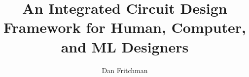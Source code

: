 \documentclass{ucbthesis}
\begin{document}
\title{An Integrated Circuit Design Framework for Human, Computer, and ML Designers}
\author{Dan Fritchman}

\maketitle
\copyrightpage

\begin{abstract}
\begin{markdown}
\end{markdown}
\end{abstract}

\begin{frontmatter}

\begin{dedication}
\null\vfil
\begin{center}
\begin{markdown}
\end{markdown}
\end{center}
\vfil\null
\end{dedication}

\tableofcontents
\clearpage
\listoffigures
\clearpage
\listoftables

\begin{acknowledgements}
\begin{markdown}
\end{markdown}
\end{acknowledgements}

\end{frontmatter}

\pagestyle{headings}

\begin{markdown}
\end{markdown}

\printbibliography
\end{document}
